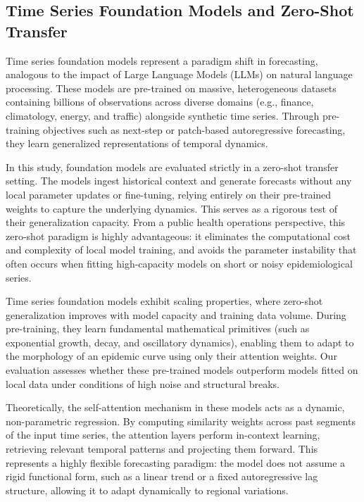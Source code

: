 \subsection{Time Series Foundation Models and Zero-Shot Transfer}
Time series foundation models represent a paradigm shift in forecasting, analogous to the impact of Large Language Models (LLMs) on natural language processing. These models are pre-trained on massive, heterogeneous datasets containing billions of observations across diverse domains (e.g., finance, climatology, energy, and traffic) alongside synthetic time series. Through pre-training objectives such as next-step or patch-based autoregressive forecasting, they learn generalized representations of temporal dynamics.

In this study, foundation models are evaluated strictly in a zero-shot transfer setting. The models ingest historical context and generate forecasts without any local parameter updates or fine-tuning, relying entirely on their pre-trained weights to capture the underlying dynamics. This serves as a rigorous test of their generalization capacity. From a public health operations perspective, this zero-shot paradigm is highly advantageous: it eliminates the computational cost and complexity of local model training, and avoids the parameter instability that often occurs when fitting high-capacity models on short or noisy epidemiological series.

Time series foundation models exhibit scaling properties, where zero-shot generalization improves with model capacity and training data volume. During pre-training, they learn fundamental mathematical primitives (such as exponential growth, decay, and oscillatory dynamics), enabling them to adapt to the morphology of an epidemic curve using only their attention weights. Our evaluation assesses whether these pre-trained models outperform models fitted on local data under conditions of high noise and structural breaks.

Theoretically, the self-attention mechanism in these models acts as a dynamic, non-parametric regression. By computing similarity weights across past segments of the input time series, the attention layers perform in-context learning, retrieving relevant temporal patterns and projecting them forward. This represents a highly flexible forecasting paradigm: the model does not assume a rigid functional form, such as a linear trend or a fixed autoregressive lag structure, allowing it to adapt dynamically to regional variations.

